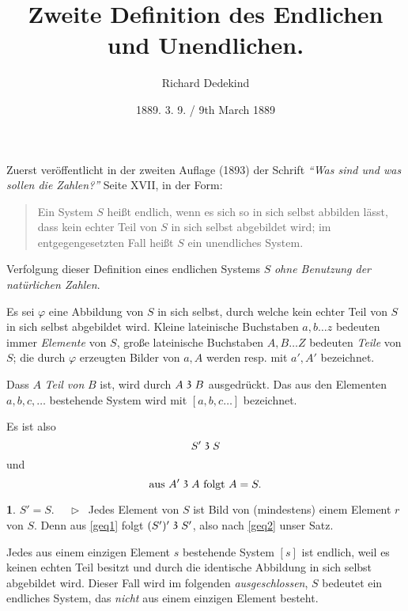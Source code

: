 \documentclass[leqno,hidelinks,a4paper]{article}
\theoremstyle{definition}
\newtheorem{sat}{\protect\satname}
\newcommand{\satname}{}
\renewcommand{\satname}{\hspace{-4pt}. Satz}%
\renewcommand{\satname}{\hspace{-4pt}. Theorem}%
\newcommand\Beweis{\newline $ \phantom{'.'} \rhd \ $}%
\newcommand\TeilVon{\mathrel{\raisebox{0.45ex}{$\mathfrak{3}$}}}
\begin{document}
\hypersetup{pageanchor=false}

\title{Zweite Definition des Endlichen und Unendlichen.}
\author{Richard Dedekind}
\date{1889. 3. 9. / \phantom{} 9th March 1889}%
\maketitle

\thispagestyle{empty}

\begin{paracol}{2} %


\noindent Zuerst veröffentlicht in der zweiten Auflage (1893) der Schrift
\textit{``Was sind und was sollen die Zahlen?''} Seite XVII, in der Form:%

\begin{quote}
Ein System $S$ heißt endlich, wenn es sich so in sich selbst abbilden
lässt, dass kein echter Teil von $S$ in sich selbst abgebildet
wird; im entgegengesetzten Fall heißt $S$ ein unendliches System.
\end{quote}

Verfolgung dieser Definition eines endlichen Systems $S$
\emph{ohne Benutzung der natürlichen Zahlen}.

Es sei $\varphi$ eine Abbildung von $S$ in sich selbst, durch welche kein echter
Teil von $S$ in sich selbst abgebildet wird.
Kleine lateinische Buchstaben  $a, b \ldots z$ bedeuten immer \emph{Elemente} von
$S$, große lateinische Buchstaben $A, B \ldots Z$ bedeuten \emph{Teile} von $S$;
die durch $\varphi$ erzeugten Bilder von $a, A$ werden resp. mit $a', A'$ bezeichnet.

Dass $A$ \emph{Teil von} $B$ ist, wird durch $A \TeilVon B$ ausgedrückt. Das aus den
Elementen $a, b, c, \ldots $ bestehende System wird mit $[a, b, c \ldots]$ bezeichnet.

Es ist also
\begin{equation}\label{geq1}
				S' \TeilVon S
\end{equation}
und%
\begin{equation}\label{geq2}
		\text{aus } A' \TeilVon A \text{ folgt } A = S.
\end{equation}

\begin{sat}\label{gthm1}$S' = S$.
\Beweis
Jedes Element von $S$ ist Bild von (mindestens) einem Element $r$ von $S$. Denn
aus \eqref{geq1} folgt $(S')' \TeilVon S'$, also nach \eqref{geq2} unser Satz.
\end{sat}
Jedes aus einem einzigen Element $s$ bestehende System $[s]$ ist endlich, weil
es keinen echten Teil besitzt und durch die identische Abbildung in sich selbst
abgebildet wird. Dieser Fall wird im folgenden \emph{ausgeschlossen}, $S$ bedeutet
ein endliches System, das \emph{nicht} aus einem einzigen Element besteht.


\end{paracol}
\end{document}
